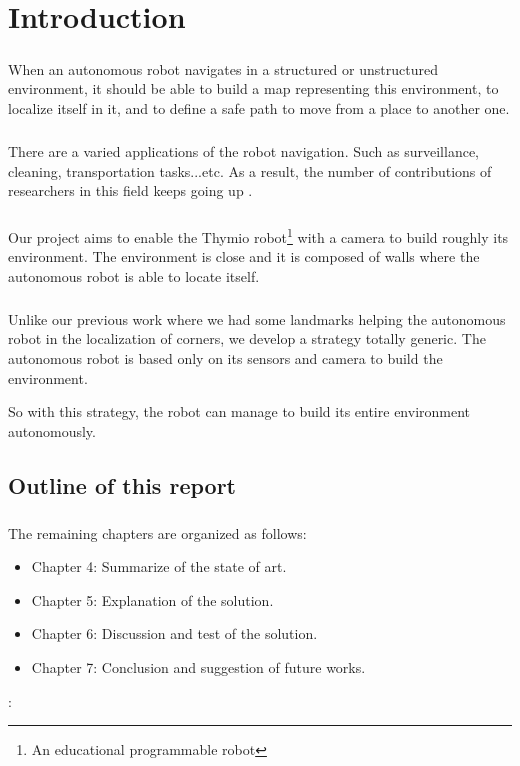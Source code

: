 \documentclass[12pt]{report}
\begin{document}
	\tableofcontents
	\chapter{Introduction}
	\paragraph{}
	When an autonomous robot navigates in a structured or unstructured environment, it should be able to build a map representing this environment, to localize itself in it, and to define a safe path to move from a place to another one.
	
	\paragraph{}
	There are a varied applications of the robot navigation. Such as surveillance, cleaning, transportation tasks...etc. As a result, the number of contributions of researchers in this field keeps going up \cite{bonin-font_visual_2008}.
	
	\paragraph{}
	Our project aims to enable the Thymio robot\footnote{An educational programmable robot} with a camera to build roughly  its environment. The environment is close and it is composed of walls where the autonomous robot is able to locate itself. 
	
	\paragraph{}
	Unlike our previous work where we had some landmarks helping the autonomous robot in the localization of corners, we develop a strategy totally generic. The autonomous robot is based only on its sensors and camera to build the environment.
	
	So with this strategy, the robot can manage to build its entire environment autonomously.
	
	
	\section{Outline of this report}
	\paragraph{}
	The remaining chapters are organized as follows:
	\begin{itemize}
		\item Chapter 4: Summarize of the state of art.
		\item Chapter 5: Explanation of the solution.
		\item Chapter 6: Discussion and test of the solution.
		\item Chapter 7: Conclusion and suggestion of future works.
	\end{itemize}: 
	
\end{document}
